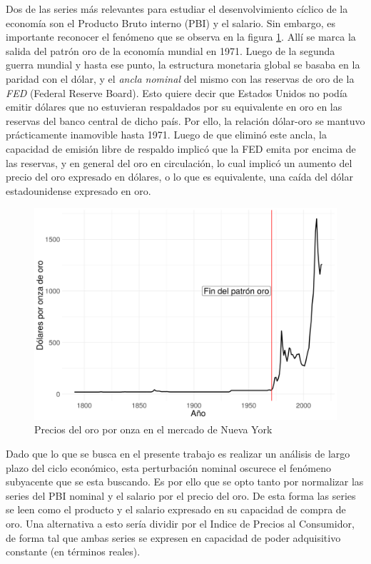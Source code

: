 \documentclass[a4paper]{article}
\begin{document}
Dos de las series más relevantes para estudiar el desenvolvimiento cíclico de la economía son el Producto Bruto interno (PBI) y el salario. Sin embargo, es importante reconocer el fenómeno que se observa en la figura \ref{fig:oro}. Allí se marca la salida del patrón oro de la economía mundial en 1971. Luego de la segunda guerra mundial y hasta ese punto, la estructura monetaria global se basaba en la paridad con el dólar, y el \textit{ancla nominal} del mismo con las reservas de oro de la \textit{FED} (Federal Reserve Board). Esto quiere decir que Estados Unidos no podía emitir dólares que no estuvieran respaldados por su equivalente en oro en las reservas del banco central de dicho país. Por ello, la relación dólar-oro se mantuvo prácticamente inamovible hasta 1971. Luego de que eliminó este ancla, la capacidad de emisión libre de respaldo implicó que la FED emita por encima de las reservas, y en general del oro en circulación, lo cual implicó un aumento del precio del oro expresado en dólares, o lo que es equivalente, una caída del dólar estadounidense expresado en oro.

\begin{figure}[H]
	\centering
	\includegraphics[width=0.8\linewidth]{oro.png}
	\caption{Precios del oro por onza en el mercado de Nueva York} \label{fig:oro}
\end{figure}

Dado que lo que se busca en el presente trabajo es realizar un análisis de largo plazo del ciclo económico, esta perturbación nominal oscurece el fenómeno subyacente que se esta buscando. Es por ello que se opto tanto por normalizar las series del PBI nominal y el salario por el precio del oro. De esta forma las series se leen como el producto y el salario expresado en su capacidad de compra de oro. Una alternativa a esto sería dividir por el Indice de Precios al Consumidor, de forma tal que ambas series se expresen en capacidad de poder adquisitivo constante (en términos reales). 
\end{document}
